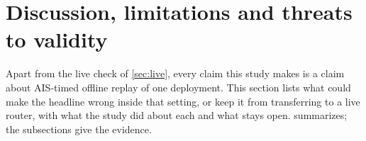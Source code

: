 %

\section{Discussion, limitations and threats to validity}
\label{sec:threats}

Apart from the live check of \cref{sec:live}, every claim this study makes is a claim about AIS-timed
offline replay of one deployment. This section lists what could make the headline wrong inside that setting, or keep it from transferring to
a live router, with what the study did about each and what stays open. 
summarizes; the subsections give the evidence.

